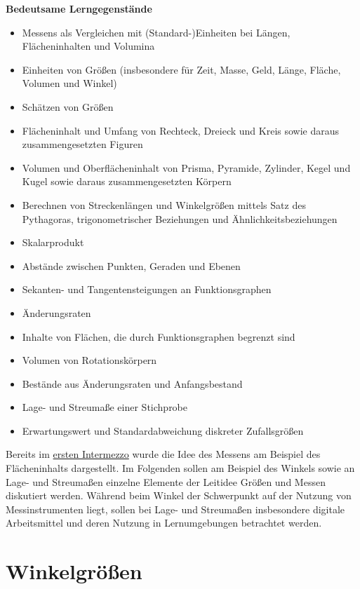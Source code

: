 \documentclass[
]{scrbook}
\providecommand{\tightlist}{%
  \setlength{\itemsep}{0pt}\setlength{\parskip}{0pt}}
\renewenvironment{quote}{
  \list{}{
	\leftmargin0.2cm   %
    \rightmargin\leftmargin
      	\def\FrameCommand
    {%
        {\color{quoteColor}\vrule width 2pt}%
        \hspace{0pt}%
    }%
    \MakeFramed{\advance \hsize -\width \FrameRestore}    \color{quoteColor}
    }
  \item\relax
}
{\endlist\color{black}\endMakeFramed}
\theoremstyle{definition}
\theoremstyle{definition}
\theoremstyle{definition}
\theoremstyle{definition}
\theoremstyle{remark}
\begin{document}
\begin{quote}
\textbf{Bedeutsame Lerngegenstände}

\begin{itemize}
\tightlist
\item
  Messens als Vergleichen mit (Standard-)Einheiten bei Längen, Flächeninhalten und Volumina
\item
  Einheiten von Größen (insbesondere für Zeit, Masse, Geld, Länge, Fläche, Volumen und Winkel)
\item
  Schätzen von Größen
\item
  Flächeninhalt und Umfang von Rechteck, Dreieck und Kreis sowie daraus zusammengesetzten Figuren
\item
  Volumen und Oberflächeninhalt von Prisma, Pyramide, Zylinder, Kegel und Kugel sowie daraus zusammengesetzten Körpern
\item
  Berechnen von Streckenlängen und Winkelgrößen mittels Satz des Pythagoras, trigonometrischer Beziehungen und Ähnlichkeitsbeziehungen
\item
  Skalarprodukt
\item
  Abstände zwischen Punkten, Geraden und Ebenen
\item
  Sekanten- und Tangentensteigungen an Funktionsgraphen
\item
  Änderungsraten
\item
  Inhalte von Flächen, die durch Funktionsgraphen begrenzt sind
\item
  Volumen von Rotationskörpern
\item
  Bestände aus Änderungsraten und Anfangsbestand
\item
  Lage- und Streumaße einer Stichprobe
\item
  Erwartungswert und Standardabweichung diskreter Zufallsgrößen
\end{itemize}
\end{quote}

Bereits im \protect\hyperlink{erstes-intermezzo-flaecheninhalt}{ersten Intermezzo} wurde die Idee des Messens am Beispiel des Flächeninhalts dargestellt. Im Folgenden sollen am Beispiel des Winkels sowie an Lage- und Streumaßen einzelne Elemente der Leitidee Größen und Messen diskutiert werden. Während beim Winkel der Schwerpunkt auf der Nutzung von Messinstrumenten liegt, sollen bei Lage- und Streumaßen insbesondere digitale Arbeitsmittel und deren Nutzung in Lernumgebungen betrachtet werden.

\hypertarget{winkelgruxf6uxdfen}{%
\section{Winkelgrößen}\label{winkelgruxf6uxdfen}}
\end{document}
